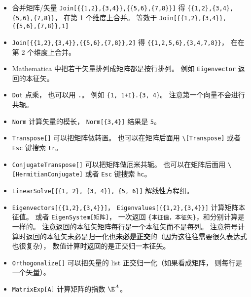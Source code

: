 \begin{itemize}
\item 合并矩阵/矢量 \verb`Join[{{1,2},{3,4}},{{5,6},{7,8}}]` 得 \verb`{{1,2},{3,4},{5,6},{7,8}}`， 在第 1 个维度上合并。 等效于 \verb`Join[{{1,2},{3,4}},{{5,6},{7,8}},1]`
\item \verb`Join[{{1,2},{3,4}},{{5,6},{7,8}},2]` 得 \verb`{{1,2,5,6},{3,4,7,8}}`， 在在第 2 个维度上合并。
\item Mathematica 中把若干矢量排列成矩阵都是按行排列。 例如 \verb`Eigenvector` 返回的本征矢。
\item \verb`Dot` 点乘， 也可以用 \verb`.`。 例如 \verb`{1, 1+I}.{3, 4}`。 注意第一个向量不会进行共轭。
\item \verb`Norm` 计算矢量的模长， \verb`Norm[{3,4}]` 结果是 \verb`5`。
\item \verb`Transpose[]` 可以把矩阵做转置。 也可以在矩阵后面用 \verb`\[Transpose]` 或者 \verb`Esc` 键搜索 \verb`tr`。
\item \verb`ConjugateTranspose[]` 可以把矩阵做厄米共轭。 也可以在矩阵后面用 \verb`\[HermitianConjugate]` 或者 \verb`Esc` 键搜索 \verb`hc`。
\item \verb`LinearSolve[{{1, 2}, {3, 4}}, {5, 6}]` 解线性方程组。
\item \verb`Eigenvectors[{{1,2},{3,4}}]`， \verb`Eigenvalues[{{1,2},{3,4}}]` 计算矩阵本征值。 或者 \verb`EigenSystem[矩阵]`， 一次返回 \verb`{本征值，本征矢}`，和分别计算是一样的。 注意返回的本征矢矩阵每行是一个本征矢而不是每列。 注意符号计算时返回的本征矢未必是归一化也\textbf{未必是正交}的（因为这往往需要很久表达式也很复杂）， 数值计算时返回的是正交归一本征矢。
\item \verb`Orthogonalize[]` 可以把矢量的 list 正交归一化（如果看成矩阵， 则每行是一个矢量）。
\item \verb`MatrixExp[A]` 计算矩阵的指数 $\E^{A}$。
\end{itemize}


